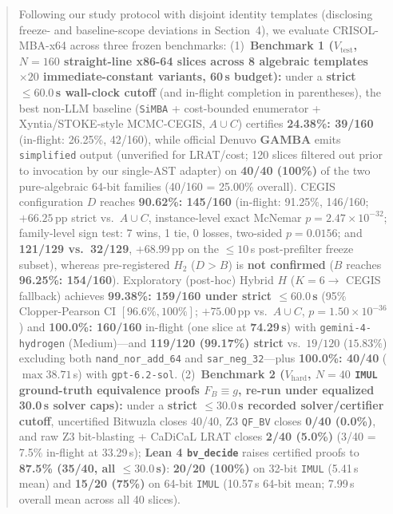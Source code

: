 \documentclass[11pt,a4paper]{article}
\begin{document}
\begin{abstract}
Following our study protocol with disjoint identity templates (disclosing freeze- and baseline-scope deviations in Section~4), we evaluate CRISOL-MBA-x64 across three frozen benchmarks:
(1)~\textbf{Benchmark 1 ($V_{\mathrm{test}}$, $N=160$ straight-line x86-64 slices across 8 algebraic templates $\times 20$ immediate-constant variants, 60\,s budget):} under a \textbf{strict $\le 60.0$\,s wall-clock cutoff} (and in-flight completion in parentheses), the best non-LLM baseline (\texttt{SiMBA} + cost-bounded enumerator + Xyntia/STOKE-style MCMC-CEGIS, $A \cup C$) certifies \textbf{24.38\%: 39/160} (in-flight: 26.25\%, 42/160), while official Denuvo \textbf{GAMBA} emits \texttt{simplified} output (unverified for LRAT/cost; 120 slices filtered out prior to invocation by our single-AST adapter) on \textbf{40/40 (100\%)} of the two pure-algebraic 64-bit families (40/160 = 25.00\% overall). CEGIS configuration $D$ reaches \textbf{90.62\%: 145/160} (in-flight: 91.25\%, 146/160; $+66.25$\,pp strict vs.\ $A \cup C$, instance-level exact McNemar $p = 2.47 \times 10^{-32}$; family-level sign test: 7 wins, 1 tie, 0 losses, two-sided $p = 0.0156$; and \textbf{121/129 vs.\ 32/129}, $+68.99$\,pp on the $\le 10$\,s post-prefilter freeze subset), whereas pre-registered $H_2$ ($D > B$) is \textbf{not confirmed} ($B$ reaches \textbf{96.25\%: 154/160}). Exploratory (post-hoc) Hybrid $H$ ($K=6 \to$ CEGIS fallback) achieves \textbf{99.38\%: 159/160 under strict $\le 60.0$\,s} (95\% Clopper-Pearson CI $[96.6\%, 100\%]$; $+75.00$\,pp vs.\ $A \cup C$, $p = 1.50 \times 10^{-36}$) and \textbf{100.0\%: 160/160} in-flight (one slice at \textbf{74.29\,s}) with \texttt{gemini-4-hydrogen} (Medium)---and \textbf{119/120 (99.17\%) strict} vs.\ $19/120$ ($15.83\%$) excluding both \texttt{nand\_nor\_add\_64} and \texttt{sar\_neg\_32}---plus \textbf{100.0\%: 40/40} ($\max 38.71$\,s) with \texttt{gpt-6.2-sol}.
(2)~\textbf{Benchmark 2 ($V_{\mathrm{hard}}$, $N=40$ \texttt{IMUL} ground-truth equivalence proofs $F_B \equiv g$, re-run under equalized 30.0\,s solver caps):} under a \textbf{strict $\le 30.0$\,s recorded solver/certifier cutoff}, uncertified Bitwuzla closes 40/40, Z3 \texttt{QF\_BV} closes \textbf{0/40 (0.0\%)}, and raw Z3 bit-blasting + CaDiCaL LRAT closes \textbf{2/40 (5.0\%)} (3/40 = 7.5\% in-flight at 33.29\,s); \textbf{Lean 4 \texttt{bv\_decide}} raises certified proofs to \textbf{87.5\% (35/40, all $\le 30.0$\,s)}: \textbf{20/20 (100\%)} on 32-bit \texttt{IMUL} (5.41\,s mean) and \textbf{15/20 (75\%)} on 64-bit \texttt{IMUL} (10.57\,s 64-bit mean; 7.99\,s overall mean across all 40 slices).

\end{abstract}
\end{document}
